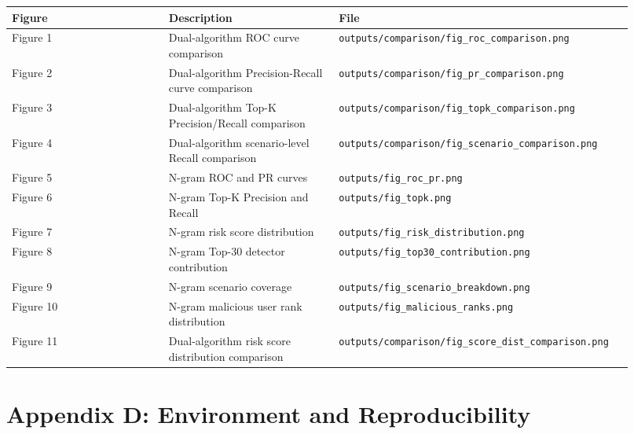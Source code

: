 \documentclass[
  a4paper,
  11pt]{article}
\newcounter{none} %
\begin{document}
{\def\LTcaptype{none} %
\begin{longtable}[]{@{}>{\raggedright\arraybackslash}p{0.24\linewidth}>{\raggedright\arraybackslash}p{0.26\linewidth}>{\raggedright\arraybackslash}p{0.42\linewidth}@{}}
\toprule\noalign{}
Figure & Description & File \\
\midrule\noalign{}
\endhead
\bottomrule\noalign{}
\endlastfoot
Figure 1 & Dual-algorithm ROC curve comparison &
\texttt{outputs/comparison/fig\_roc\_comparison.png} \\
Figure 2 & Dual-algorithm Precision-Recall curve comparison &
\texttt{outputs/comparison/fig\_pr\_comparison.png} \\
Figure 3 & Dual-algorithm Top-K Precision/Recall comparison &
\texttt{outputs/comparison/fig\_topk\_comparison.png} \\
Figure 4 & Dual-algorithm scenario-level Recall comparison &
\texttt{outputs/comparison/fig\_scenario\_comparison.png} \\
Figure 5 & N-gram ROC and PR curves &
\texttt{outputs/fig\_roc\_pr.png} \\
Figure 6 & N-gram Top-K Precision and Recall &
\texttt{outputs/fig\_topk.png} \\
Figure 7 & N-gram risk score distribution &
\texttt{outputs/fig\_risk\_distribution.png} \\
Figure 8 & N-gram Top-30 detector contribution &
\texttt{outputs/fig\_top30\_contribution.png} \\
Figure 9 & N-gram scenario coverage &
\texttt{outputs/fig\_scenario\_breakdown.png} \\
Figure 10 & N-gram malicious user rank distribution &
\texttt{outputs/fig\_malicious\_ranks.png} \\
Figure 11 & Dual-algorithm risk score distribution comparison &
\texttt{outputs/comparison/fig\_score\_dist\_comparison.png} \\
\end{longtable}
}

\section{Appendix D: Environment and
Reproducibility}\label{appendix-d-environment-and-reproducibility}
\end{document}
